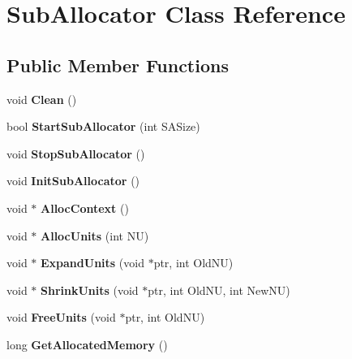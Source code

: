 \hypertarget{class_sub_allocator}{\section{Sub\-Allocator Class Reference}
\label{class_sub_allocator}
}
\subsection*{Public Member Functions}
\begin{DoxyCompactItemize}
\item 
\hypertarget{class_sub_allocator_a212c556a0af59fed290008a88007ad2c}{void {\bfseries Clean} ()}\label{class_sub_allocator_a212c556a0af59fed290008a88007ad2c}

\item 
\hypertarget{class_sub_allocator_ab8065281115597696cf1b7c259cafc43}{bool {\bfseries Start\-Sub\-Allocator} (int S\-A\-Size)}\label{class_sub_allocator_ab8065281115597696cf1b7c259cafc43}

\item 
\hypertarget{class_sub_allocator_aac677cfd44f4efc22f792d197f69f7e6}{void {\bfseries Stop\-Sub\-Allocator} ()}\label{class_sub_allocator_aac677cfd44f4efc22f792d197f69f7e6}

\item 
\hypertarget{class_sub_allocator_a59f279eac051c2f489a06ba7aedc2d94}{void {\bfseries Init\-Sub\-Allocator} ()}\label{class_sub_allocator_a59f279eac051c2f489a06ba7aedc2d94}

\item 
\hypertarget{class_sub_allocator_ad4bc0686b9b2b01913e8c574956aa403}{void $\ast$ {\bfseries Alloc\-Context} ()}\label{class_sub_allocator_ad4bc0686b9b2b01913e8c574956aa403}

\item 
\hypertarget{class_sub_allocator_ae601b3aa72108ebf20f4de8c1b75a6c8}{void $\ast$ {\bfseries Alloc\-Units} (int N\-U)}\label{class_sub_allocator_ae601b3aa72108ebf20f4de8c1b75a6c8}

\item 
\hypertarget{class_sub_allocator_a43a8793154fdffe04e05ca8b15700dd5}{void $\ast$ {\bfseries Expand\-Units} (void $\ast$ptr, int Old\-N\-U)}\label{class_sub_allocator_a43a8793154fdffe04e05ca8b15700dd5}

\item 
\hypertarget{class_sub_allocator_aa1bd219580ce6e1bc2b42b1436a22238}{void $\ast$ {\bfseries Shrink\-Units} (void $\ast$ptr, int Old\-N\-U, int New\-N\-U)}\label{class_sub_allocator_aa1bd219580ce6e1bc2b42b1436a22238}

\item 
\hypertarget{class_sub_allocator_a4ad0e2df3064e52bbfae963c41ae7c6c}{void {\bfseries Free\-Units} (void $\ast$ptr, int Old\-N\-U)}\label{class_sub_allocator_a4ad0e2df3064e52bbfae963c41ae7c6c}

\item 
\hypertarget{class_sub_allocator_a98aba9288cdfc643486c65794d97a865}{long {\bfseries Get\-Allocated\-Memory} ()}\label{class_sub_allocator_a98aba9288cdfc643486c65794d97a865}

\end{DoxyCompactItemize}
